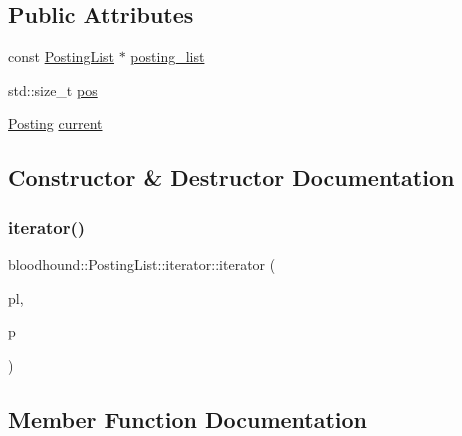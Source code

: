 \subsection*{Public Attributes}
\begin{DoxyCompactItemize}
\item 
const \hyperlink{classbloodhound_1_1PostingList}{Posting\+List} $\ast$ \hyperlink{structbloodhound_1_1PostingList_1_1iterator_a3a9afedb85f883831ee68fee0611ca92}{posting\+\_\+list}
\item 
std\+::size\+\_\+t \hyperlink{structbloodhound_1_1PostingList_1_1iterator_a544fdd6020d2ec35d883250dd79115e8}{pos}
\item 
\hyperlink{structbloodhound_1_1Posting}{Posting} \hyperlink{structbloodhound_1_1PostingList_1_1iterator_ae4e6a0f32f80ac9f64558843a0a0cf0e}{current}
\end{DoxyCompactItemize}


\subsection{Constructor \& Destructor Documentation}
\mbox{\label{structbloodhound_1_1PostingList_1_1iterator_af815248890d1f92dbd2cc3fa5813875a}} 
\subsubsection{\texorpdfstring{iterator()}{iterator()}}
{\footnotesize\ttfamily bloodhound\+::\+Posting\+List\+::iterator\+::iterator (\begin{DoxyParamCaption}\item[{const \hyperlink{classbloodhound_1_1PostingList}{Posting\+List} $\ast$}]{pl,  }\item[{std\+::size\+\_\+t}]{p }\end{DoxyParamCaption})\hspace{0.3cm}{\ttfamily [inline]}}



\subsection{Member Function Documentation}
\mbox{\label{structbloodhound_1_1PostingList_1_1iterator_aa293b4e0607edaca2fde163c8ee0f00e}} 
